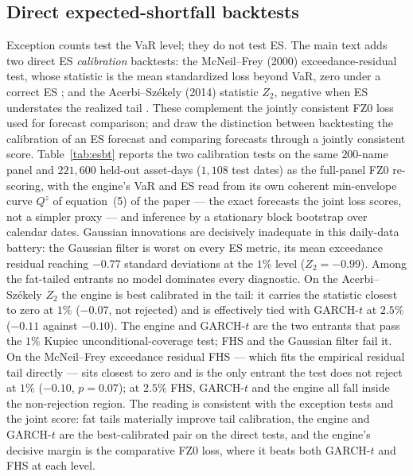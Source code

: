 \documentclass[11pt]{article}
\begin{document}
\subsection*{Direct expected-shortfall backtests}\label{sec:esbt-oa}
Exception counts test the VaR level; they do not test ES. The main text adds two
direct ES \emph{calibration} backtests: the McNeil--Frey (2000)
exceedance-residual test, whose statistic is the mean standardized loss beyond
VaR, zero under a correct ES \citep{mcneilfrey2000}; and the Acerbi--Sz\'ekely
(2014) statistic $Z_2$, negative when ES understates the realized tail
\citep{acerbi2014backtesting}. These complement the jointly consistent FZ0 loss
used for forecast comparison; \citet{noldeziegel2017elicitability} and
\citet{bayer2022esr} draw the distinction between backtesting the calibration of
an ES forecast and comparing forecasts through a jointly consistent score.
Table~\ref{tab:esbt} reports the two calibration tests on the same $200$-name
panel and $221{,}600$ held-out asset-days ($1{,}108$ test dates) as the
full-panel FZ0 re-scoring, with the engine's VaR and ES read from its own
coherent min-envelope curve $Q^{z}$ of equation~(5) of the paper --- the exact forecasts the joint loss
scores, not a simpler proxy --- and inference by a stationary block bootstrap
over calendar dates. Gaussian innovations are decisively inadequate in this
daily-data battery: the Gaussian filter is worst on every ES metric, its mean
exceedance residual reaching $-0.77$ standard deviations at the $1\%$ level
($Z_2=-0.99$). Among the fat-tailed entrants no model dominates every diagnostic.
On the Acerbi--Sz\'ekely $Z_2$ the engine is best calibrated in the tail: it
carries the statistic closest to zero at $1\%$ ($-0.07$, not rejected) and is
effectively tied with GARCH-$t$ at $2.5\%$ ($-0.11$ against $-0.10$). The engine
and GARCH-$t$ are the two entrants that pass the $1\%$ Kupiec
unconditional-coverage test; FHS and the Gaussian filter fail it. On the
McNeil--Frey exceedance residual FHS --- which fits the empirical residual tail
directly --- sits closest to zero and is the only entrant the test does not
reject at $1\%$ ($-0.10$, $p=0.07$); at $2.5\%$ FHS, GARCH-$t$ and the engine all
fall inside the non-rejection region. The reading is consistent with the
exception tests and the joint score: fat tails materially improve tail
calibration, the engine and GARCH-$t$ are the best-calibrated pair on the direct
tests, and the engine's decisive margin is the comparative FZ0 loss, where it
beats both GARCH-$t$ and FHS at each level.
\end{document}
